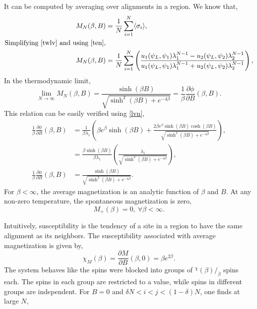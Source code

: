 \documentclass[letterpaper,english,12pt]{article}
\begin{document}
\begin{defn} It can be computed by averaging over alignments in a region. 
We know that,
\begin{align}
M_{N}(\beta,B) &= \frac{1}{N}\sum_{i=1}^{N}\langle\sigma_{i}\rangle,\nonumber\\
\text{Simplifying \eqref{twlv} and using \eqref{ten}},\nonumber\\
M_{N}(\beta,B) &= \frac{1}{N} \sum_{i=1}^{N} \left(\frac{u_{1}(\psi_{L},\psi_{1})\lambda_{1}^{N-1}-u_{2}(\psi_{L},\psi_{2})\lambda_{2}^{N-1}}{u_{1}(\psi_{L},\psi_{1})\lambda_{1}^{N-1}+u_{2}(\psi_{L},\psi_{2})\lambda_{2}^{N-1}}\right),\nonumber
\end{align}
In the thermodynamic limit, 
\begin{equation}
\lim \limits_{N\rightarrow\infty}M_{N}(\beta,B) = \frac{\sinh (\beta B)}{\sqrt{\sinh^{2}(\beta B)+e^{-4\beta}}} = \frac{1}{\beta}\frac{\partial \phi}{\partial B}(\beta,B).
\end{equation}
This relation can be easily verified using \eqref{lvn},
\begin{align}
\frac{1}{\beta}\frac{\partial \phi}{\partial B}(\beta,B) &= \frac{1}{\beta \lambda_{1}}\left(\beta e^{\beta}\sinh(\beta B)+\frac{2\beta e^{\beta}\sinh(\beta B)\cosh(\beta B)}{\sqrt{\sinh^{2}(\beta B)+e^{-4\beta}}}\right),\nonumber\\
&= \frac{\beta \sinh(\beta B)}{\beta \lambda_{1}}\left(\frac{\lambda_{1}}{\sqrt{\sinh^{2}(\beta B)+e^{-4\beta}}}\right),\nonumber\\
\frac{1}{\beta}\frac{\partial \phi}{\partial B}(\beta,B) &=\frac{\sinh (\beta B)}{\sqrt{\sinh^{2}(\beta B)+e^{-4\beta}}}.\nonumber
\end{align}
For $\beta < \infty$, the average magnetization is an analytic function of $\beta$ and $B$. At any non-zero temperature, the spontaneous magnetization is zero,
$$M_{+}(\beta) = 0,~\forall \beta < \infty.$$

\begin{defn}[Susceptibility]
Intuitively, susceptibility is the tendency of a site in a region to have the same alignment as its neighbors. The susceptibility associated with average magnetization is given by,
\begin{equation}
\chi_{M}(\beta)=\frac{\partial M}{ \partial B}(\beta,0) = \beta e^{2\beta}.
\end{equation}
The system behaves like the spins were blocked into groups of $^\chi(\beta)/_\beta$ spins each. The spins in each group are restricted to a value, while spins in different groups are independent. For $B=0$ and $\delta N<i<j<(1-\delta)N$, one finds at large $N$, 


\end{defn}
\end{defn}
\end{document}
